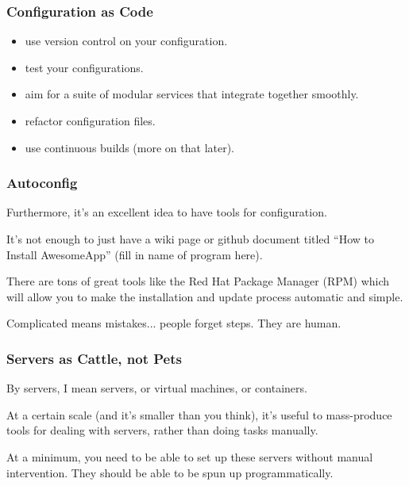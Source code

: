 \begin{frame}
\frametitle{Configuration as Code}

\begin{itemize}
\item use version control on your configuration.
\item test your configurations.
\item aim for a suite of modular services that integrate together smoothly.
\item refactor configuration files.
\item use continuous builds (more on that later).
\end{itemize}

\end{frame}



\begin{frame}
\frametitle{Autoconfig}

Furthermore, it's an excellent idea to have tools for configuration. 

It's not enough to just have a wiki page or github document titled ``How to Install AwesomeApp'' (fill in name of program here). 

There are tons of great tools like the Red Hat Package Manager (RPM) which will allow you to make the installation and update process automatic and simple.

 Complicated means mistakes... people forget steps. They are human. 

\end{frame}



\begin{frame}
\frametitle{Servers as Cattle, not Pets}

By servers, I mean servers, or virtual machines, or containers.


At a certain scale (and it's smaller than you think), it's useful to
mass-produce tools for dealing with servers, rather than doing tasks
manually. 

At a minimum, you need to be able to set up these servers
without manual intervention. They should be able to be spun up 
programmatically.

\end{frame}



